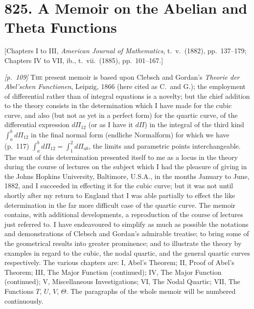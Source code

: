 \documentclass[11pt,a4paper]{article}
\theoremstyle{plain}
\theoremstyle{definition}
\theoremstyle{remark}
\begin{document}
\section*{825. A Memoir on the Abelian and Theta Functions}

\begin{center}
\small[Chapters I to III, \textit{American Journal of Mathematics}, t.~v.\ (1882), pp.~137--179;\\
Chapters IV to VII, ib., t.~vii.\ (1885), pp.~101--167.]
\end{center}

\bigskip

\noindent\textit{[p.~109]} \textsc{The} present memoir is based upon Clebsch and Gordan's \textit{Theorie der Abel'schen Functionen}, Leipzig, 1866 (here cited as C.\ and G.); the employment of differential rather than of integral equations is a novelty; but the chief addition to the theory consists in the determination which I have made for the cubic curve, and also (but not as yet in a perfect form) for the quartic curve, of the differential expression $d\Pi_{12}$ (or as I have it $d\Pi$) in the integral of the third kind $\int_{a}^{b} d\Pi_{12}$ in the final normal form (endliche Normalform) for which we have (p.~117) $\int_{a}^{b} d\Pi_{12} = \int_{1}^{2} d\Pi_{ab}$, the limits and parametric points interchangeable. The want of this determination presented itself to me as a locus in the theory during the course of lectures on the subject which I had the pleasure of giving in the Johns Hopkins University, Baltimore, U.S.A., in the months January to June, 1882, and I succeeded in effecting it for the cubic curve; but it was not until shortly after my return to England that I was able partially to effect the like determination in the far more difficult case of the quartic curve. The memoir contains, with additional developments, a reproduction of the course of lectures just referred to. I have endeavoured to simplify as much as possible the notations and demonstrations of Clebsch and Gordan's admirable treatise; to bring some of the geometrical results into greater prominence; and to illustrate the theory by examples in regard to the cubic, the nodal quartic, and the general quartic curves respectively. The various chapters are: I, Abel's Theorem; II, Proof of Abel's Theorem; III, The Major Function (continued); IV, The Major Function (continued); V, Miscellaneous Investigations; VI, The Nodal Quartic; VII, The Functions $T$, $U$, $V$, $\Theta$. The paragraphs of the whole memoir will be numbered continuously.
\end{document}
